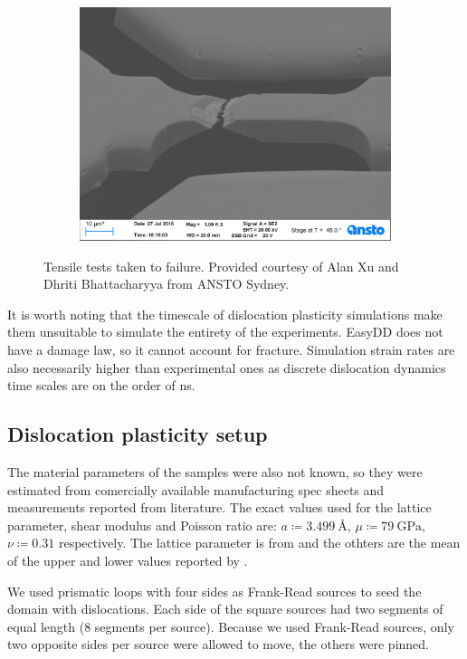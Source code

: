\begin{figure}
\begin{subfigure}[t]{0.3\linewidth}
        \includegraphics[width=\linewidth]{../data/Ni039.jpg}
    \end{subfigure}
    \caption{Tensile tests taken to failure. Provided courtesy of Alan Xu and Dhriti Bhattacharyya from ANSTO Sydney.}
    \label{f:tensileFailure}
\end{figure}

It is worth noting that the timescale of dislocation plasticity simulations make them unsuitable to simulate the entirety of the experiments. EasyDD does not have a damage law, so it cannot account for fracture. Simulation strain rates are also necessarily higher than experimental ones as discrete dislocation dynamics time scales are on the order of \si{\nano\second}.

\subsection{Dislocation plasticity setup}
\label{ss:modelSetup}

The material parameters of the samples were also not known, so they were estimated from comercially available manufacturing spec sheets and measurements reported from literature. The exact values used for the lattice parameter, shear modulus and Poisson ratio are: $a \coloneqq \SI{3.499}{\angstrom}$, $ \mu  \coloneqq \SI{79}{\giga\pascal}$, $\nu \coloneqq 0.31$ respectively. The lattice parameter is from \cite{ni_lattice} and the othters are the mean of the upper and lower values reported by \cite{azom_nickel}.

We used prismatic loops with four sides as Frank-Read sources to seed the domain with dislocations. Each side of the square sources had two segments of equal length (8 segments per source). Because we used Frank-Read sources, only two opposite sides per source were allowed to move, the others were pinned.

